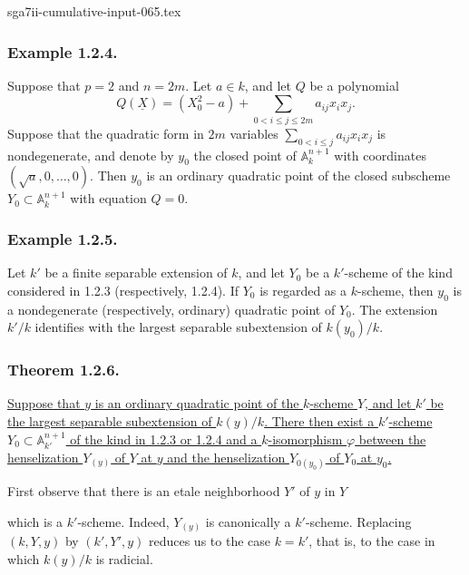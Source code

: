 \begin{filecontents*}{sga7ii-cumulative-input-065.tex}
\subsubsection*{Example 1.2.4.}
Suppose that $p=2$ and $n=2m$.  Let $a\in k$, and let $Q$ be a
polynomial
\[
Q(\underline X)=(X_0^2-a)
 +\sum_{0<i\leq j\leq2m}a_{ij}x_ix_j.
\]
Suppose that the quadratic form in $2m$ variables
$\sum_{0<i\leq j}a_{ij}x_ix_j$ is nondegenerate, and denote by $y_0$
the closed point of $\mathbb A_k^{n+1}$ with coordinates
$(\sqrt a,0,\ldots,0)$.  Then $y_0$ is an ordinary quadratic point
of the closed subscheme $Y_0\subset\mathbb A_k^{n+1}$ with equation
$Q=0$.

\subsubsection*{Example 1.2.5.}
Let $k'$ be a finite separable extension of $k$, and let $Y_0$ be a
$k'$-scheme of the kind considered in 1.2.3 (respectively, 1.2.4).
If $Y_0$ is regarded as a $k$-scheme, then $y_0$ is a nondegenerate
(respectively, ordinary) quadratic point of $Y_0$.  The extension
$k'/k$ identifies with the largest separable subextension of
$k(y_0)/k$.

\subsubsection*{Theorem 1.2.6.}
\underline{Suppose that $y$ is an ordinary quadratic point of the
$k$-scheme $Y$, and let $k'$ be the largest separable subextension
of $k(y)/k$.  There then exist a $k'$-scheme
$Y_0\subset\mathbb A_{k'}^{n+1}$ of the kind in 1.2.3 or 1.2.4 and a
$k$-isomorphism $\varphi$ between the henselization $Y_{(y)}$ of $Y$
at $y$ and the henselization $Y_{0(y_0)}$ of $Y_0$ at $y_0$.}

First observe that there is an etale neighborhood $Y'$ of $y$ in
$Y$
\begin{center}
\end{center}
which is a $k'$-scheme.  Indeed, $Y_{(y)}$ is canonically a
$k'$-scheme.  Replacing $(k,Y,y)$ by $(k',Y',y)$ reduces us to the
case $k=k'$, that is, to the case in which $k(y)/k$ is radicial.
\end{filecontents*}

